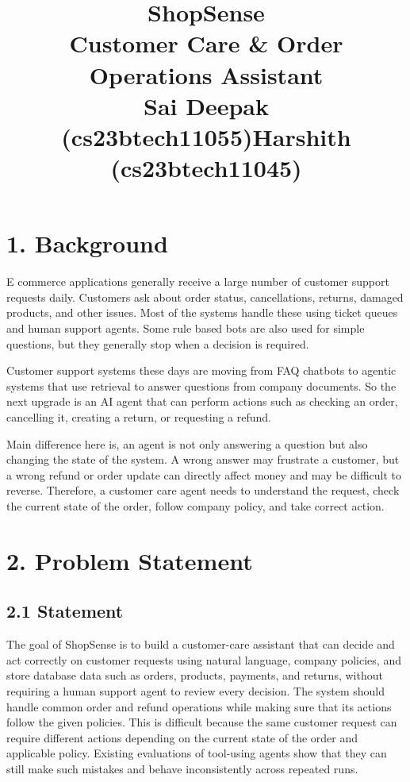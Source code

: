 \documentclass[11pt,a4paper]{article}
\title{\vspace{-2.4cm}\textbf{ShopSense}\\[6pt]
       \large Customer Care \& Order Operations Assistant \\[9pt]
       Sai Deepak (cs23btech11055)\quad Harshith (cs23btech11045)}
\author{}
\date{}
\begin{document}
\maketitle
\vspace{-1.0cm}

\section*{1. Background}

E commerce applications generally receive a large number of customer support requests daily. Customers ask about order status, cancellations, returns, damaged products, and other issues. Most of the systems handle these using ticket queues and human support agents. Some rule based bots are also used for simple questions, but they generally stop when a decision is required.

Customer support systems these days are moving from FAQ chatbots to agentic systems that use retrieval to answer questions from company documents. So the next upgrade is an AI agent that can perform actions such as checking an order, cancelling it, creating a return, or requesting a refund.

Main difference here is, an agent is not only answering a question but also changing the state of the system. A wrong answer may frustrate a customer, but a wrong refund or order update can directly affect money and may be difficult to reverse. Therefore, a customer care agent needs to understand the request, check the current state of the order, follow company policy, and take correct action.

\section*{2. Problem Statement}

\subsection*{2.1 Statement}

The goal of ShopSense is to build a customer-care assistant that can decide and act correctly on customer requests using natural language, company policies, and store database data such as orders, products, payments, and returns, without requiring a human support agent to review every decision. The system should handle common order and refund operations while making sure that its actions follow the given policies. This is difficult because the same customer request can require different actions depending on the current state of the order and applicable policy. Existing evaluations of tool-using agents show that they can still make such mistakes and behave inconsistently across repeated runs. \cite{taubench}
\end{document}

